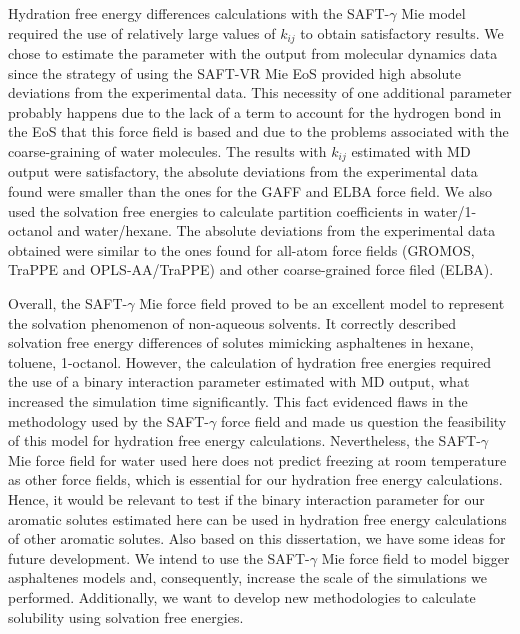 Hydration free energy differences calculations with the SAFT-$\gamma$ Mie model required the use of relatively large values of $k_{ij}$ to obtain satisfactory results. We chose to estimate the parameter with the output from molecular dynamics data since the strategy of using the SAFT-VR Mie EoS provided high absolute deviations from the experimental data. This necessity of one additional parameter probably happens due to the lack of a term to account for the hydrogen bond in the EoS that this force field is based and due to the problems associated with the coarse-graining of water molecules. The results with $k_{ij}$ estimated with MD output were satisfactory, the absolute deviations from the experimental data found were smaller than the ones for the GAFF and ELBA force field. We also used the solvation free energies to calculate partition coefficients in water/1-octanol and water/hexane. The absolute deviations from the experimental data obtained were similar to the ones found for all-atom force fields (GROMOS, TraPPE and OPLS-AA/TraPPE) and other coarse-grained force filed (ELBA).

Overall, the SAFT-$\gamma$ Mie force field proved to be an excellent model to represent the solvation phenomenon of non-aqueous solvents. It correctly described solvation free energy differences of solutes mimicking asphaltenes in hexane, toluene, 1-octanol. However, the calculation of hydration free energies required the use of a binary interaction parameter estimated with MD output, what increased the simulation time significantly. This fact evidenced flaws in the methodology used by the SAFT-$\gamma$ force field and made us question the feasibility of this model for hydration free energy calculations. Nevertheless, the SAFT-$\gamma$ Mie force field for water used here does not predict freezing at room temperature as other force fields, which is essential for our hydration free energy calculations. Hence, it would be relevant to test if the binary interaction parameter for our aromatic solutes estimated here can be used in hydration free energy calculations of other aromatic solutes. Also based on this dissertation, we have some ideas for future development. We intend to use the SAFT-$\gamma$ Mie force field to model bigger asphaltenes models and, consequently, increase the scale of the simulations we performed. Additionally, we want to develop new methodologies to calculate solubility using solvation free energies.


